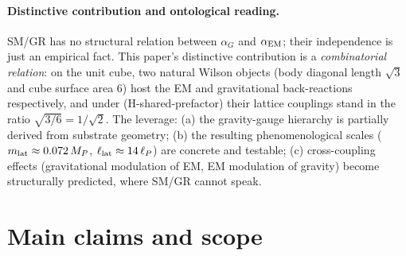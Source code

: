 \documentclass[11pt,a4paper]{article}
\begin{document}
\paragraph{Distinctive contribution and ontological reading.}
SM/GR has no structural relation between $\alpha_G$ and $\alpha_{\rm EM}$; their independence is just an empirical fact. This paper's distinctive contribution is a \emph{combinatorial relation}: on the unit cube, two natural Wilson objects (body diagonal length $\sqrt{3}$ and cube surface area $6$) host the EM and gravitational back-reactions respectively, and under (H-shared-prefactor) their lattice couplings stand in the ratio $\sqrt{3/6} = 1/\sqrt{2}$. The leverage: (a) the gravity-gauge hierarchy is partially derived from substrate geometry; (b) the resulting phenomenological scales ($m_{\rm lat} \approx 0.072\,M_P$, $\ell_{\rm lat} \approx 14\,\ell_P$) are concrete and testable; (c) cross-coupling effects (gravitational modulation of EM, EM modulation of gravity) become structurally predicted, where SM/GR cannot speak.


\section{Main claims and scope}
\label{sec:claims}
\end{document}
